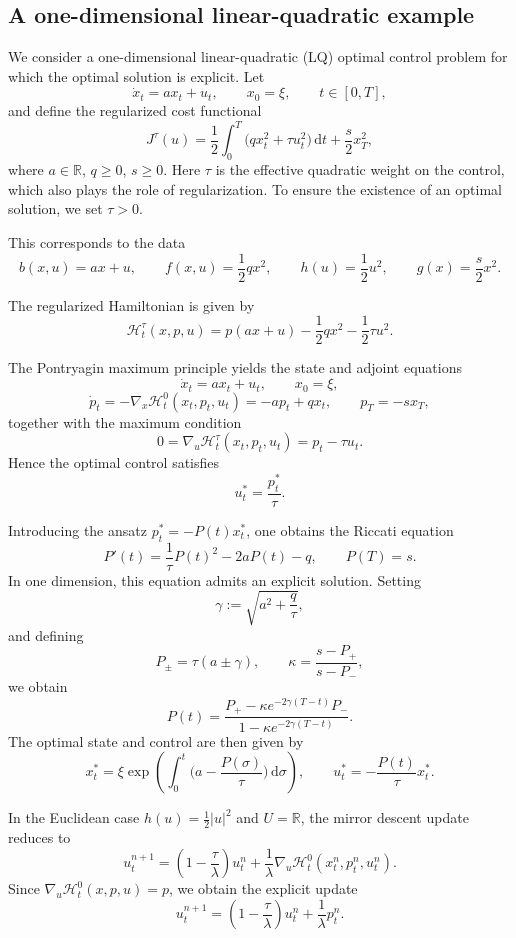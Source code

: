 \documentclass[11pt]{amsart}
\theoremstyle{plain}
\theoremstyle{definition}
\theoremstyle{remark}
\newcommand{\dd}{\,\mathrm{d}}
\begin{document}
\subsection{A one-dimensional linear-quadratic example}

We consider a one-dimensional linear-quadratic (LQ) optimal control problem for which the optimal solution is explicit. Let
\[
\dot x_t = a x_t + u_t, \qquad x_0 = \xi, \qquad t \in [0,T],
\]
and define the regularized cost functional
\[
J^\tau(u)
=
\frac{1}{2}\int_0^T \Big( q x_t^2 + \tau u_t^2 \Big)\dd t
+
\frac{s}{2} x_T^2,
\]
where $a\in\mathbb{R}$, $q\ge 0$, $s\ge 0$. Here $\tau$ is the effective quadratic weight on the control, which also plays the role of regularization. To ensure the existence of an optimal solution, we set $\tau > 0$.

This corresponds to the data
\[
b(x,u)=ax+u,\qquad
f(x,u)=\frac{1}{2}q x^2,\qquad
h(u)=\frac{1}{2}u^2,\qquad
g(x)=\frac{s}{2}x^2.
\]

The regularized Hamiltonian is given by
\[
\mathcal H_t^\tau(x,p,u)
=
p(ax+u) - \frac{1}{2}q x^2 - \frac{1}{2} \tau u^2.
\]

The Pontryagin maximum principle yields the state and adjoint equations
\[
\dot x_t = a x_t + u_t,\qquad x_0=\xi,
\]
\[
\dot p_t = -\nabla_x \mathcal H_t^0(x_t,p_t,u_t) = -a p_t + q x_t,\qquad
p_T = -s x_T,
\]
together with the maximum condition
\[
0 = \nabla_u \mathcal H_t^\tau(x_t,p_t,u_t) = p_t - \tau u_t.
\]
Hence the optimal control satisfies
\[
u_t^* = \frac{p_t^*}{\tau}.
\]

Introducing the ansatz $p_t^* = -P(t)x_t^*$, one obtains the Riccati equation
\[
P'(t)
=
\frac{1}{\tau}P(t)^2 - 2aP(t) - q,
\qquad
P(T)=s.
\]
In one dimension, this equation admits an explicit solution. Setting
\[
\gamma := \sqrt{a^2 + \frac{q}{\tau}},
\]
and defining
\[
P_\pm = \tau(a \pm \gamma),
\qquad
\kappa = \frac{s - P_+}{s - P_-},
\]
we obtain
\[
P(t)
=
\frac{P_+ - \kappa e^{-2\gamma(T-t)} P_-}
{1 - \kappa e^{-2\gamma(T-t)}}.
\]
The optimal state and control are then given by
\[
x_t^*
=
\xi \exp\!\left(\int_0^t \Big(a - \frac{P(\sigma)}{\tau}\Big)\dd\sigma\right),
\qquad
u_t^*
=
-\frac{P(t)}{\tau} x_t^*.
\]

In the Euclidean case $h(u)=\frac12|u|^2$ and $U=\mathbb{R}$, the mirror descent update reduces to
\[
u_t^{n+1}
=
\left(1-\frac{\tau}{\lambda}\right)u_t^n
+
\frac{1}{\lambda}\nabla_u \mathcal H_t^0(x_t^n,p_t^n,u_t^n).
\]
Since $\nabla_u \mathcal H_t^0(x,p,u)=p$,
we obtain the explicit update
\[
u_t^{n+1}
=
\left(1-\frac{\tau}{\lambda}\right)u_t^n
+
\frac{1}{\lambda}p_t^n.
\]
\end{document}
